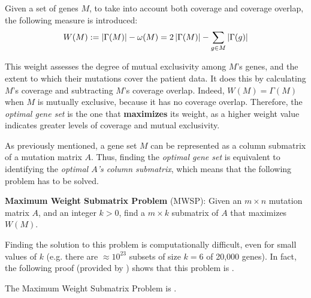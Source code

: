 \begin{definition} \label{weight}
    Given a set of genes $M$, to take into account both coverage and coverage overlap, the following measure is introduced: $$W(M): = \left|\Gamma(M)\right| - \omega(M) = 2 \left|\Gamma(M)\right| - \sum_{g \in M} {\left|\Gamma(g)\right|}$$
\end{definition}

This weight assesses the degree of mutual exclusivity among $M$'s genes, and the extent to which their mutations cover the patient data. It does this by calculating $M$'s coverage and subtracting $M$'s coverage overlap. Indeed, $W(M) = \Gamma(M)$ when $M$ is mutually exclusive, because it has no coverage overlap. Therefore, the \textit{optimal gene set} is the one that \textbf{maximizes} its weight, as a higher weight value indicates greater levels of coverage and mutual exclusivity.

As previously mentioned, a gene set $M$ can be represented as a column submatrix of a mutation matrix $A$. Thus, finding the \textit{optimal gene set} is equivalent to identifying the \textit{optimal $A$'s column submatrix}, which means that the following problem has to be solved.

\begin{displayquote}\label{mwsp}
    \textbf{Maximum Weight Submatrix Problem} (MWSP): Given an $m \times n$ mutation matrix $A$, and an integer $k > 0$, find a $m \times k$ submatrix of $A$ that maximizes $W(M)$.
\end{displayquote}

Finding the solution to this problem is computationally difficult, even for small values of $k$ (e.g. there are $\approx 10^{23}$ subsets of size $k = 6$ of 20,000 genes). In fact, the following proof (provided by \textcite{dendrix}) shows that this problem is \NPComplete.

\begin{theorem} \label{mwsp proof}
    The Maximum Weight Submatrix Problem is \NPComplete.
\end{theorem}

